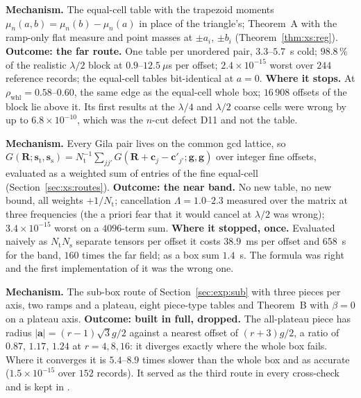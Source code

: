 \begin{description}[leftmargin=1.4em]
\item[(u$_1$) The whole trapezoid box.] \textbf{Mechanism.} The equal-cell table with the
trapezoid moments $\mu_n(a,b) = \mu_n(b)-\mu_n(a)$ in place of the triangle's; Theorem~A
with the ramp-only flat measure and point masses at $\pm a_i$, $\pm b_i$
(Theorem~\ref{thm:xs:reg}). \textbf{Outcome: the far route.} One table per unordered pair,
$3.3$--$5.7$~s cold; $98.8\,\%$ of the realistic $\lambda/2$ block at $0.9$--$12.5~\mu$s
per offset; $2.4\times10^{-15}$ worst over $244$ reference records; the equal-cell tables
bit-identical at $a = 0$. \textbf{Where it stops.} At $\rho_{\mathrm{whl}} = 0.58$--$0.60$,
the same edge as the equal-cell whole box; $16\,908$ offsets of the block lie above it. Its
first results at the $\lambda/4$ and $\lambda/2$ coarse cells were wrong by up to
$6.8\times10^{-10}$, which was the $n$-cut defect D11 and not the table.

\item[(u$_2$) The gcd average as a box sum.] \textbf{Mechanism.} Every Gila pair lives on
the common gcd lattice, so
$G(\mathbf{R};\mathbf{s}_{\mathrm{t}},\mathbf{s}_{\mathrm{s}}) = N_{\mathrm{t}}^{-1}\sum_{jj'}
G(\mathbf{R}+\mathbf{c}_j-\mathbf{c}'_{j'};\mathbf{g},\mathbf{g})$ over integer fine
offsets, evaluated as a weighted sum of entries of the fine equal-cell 
(Section~\ref{sec:xs:routes}). \textbf{Outcome: the near band.} No new table, no new bound,
all weights $+1/N_{\mathrm{t}}$; cancellation $\Lambda = 1.0$--$2.3$ measured over the
matrix at three frequencies (the a priori fear that it would cancel at $\lambda/2$ was
wrong); $3.4\times10^{-15}$ worst on a $4096$-term sum. \textbf{Where it stopped, once.}
Evaluated naively as $N_{\mathrm{t}}N_{\mathrm{s}}$ separate tensors per offset it costs
$38.9$~ms per offset and $658$~s for the band, $160$ times the far field; as a box sum
$1.4$~s. The formula was right and the first implementation of it was the wrong one.

\item[(u$_3$) The twenty-seven-piece split.] \textbf{Mechanism.} The sub-box route of
Section~\ref{sec:exp:sub} with three pieces per axis, two ramps and a plateau, eight
piece-type tables and Theorem~B with $\beta = 0$ on a plateau axis. \textbf{Outcome:
built in full, dropped.} The all-plateau piece has radius $|\mathbf{a}| = (r-1)\sqrt3g/2$
against a nearest offset of $(r+3)g/2$, a ratio of $0.87$, $1.17$, $1.24$ at $r = 4, 8, 16$:
it diverges exactly where the whole box fails. Where it converges it is $5.4$--$8.9$ times
slower than the whole box and as accurate ($1.5\times10^{-15}$ over $152$ records). It
served as the third route in every cross-check and is kept in
.


\end{description}
